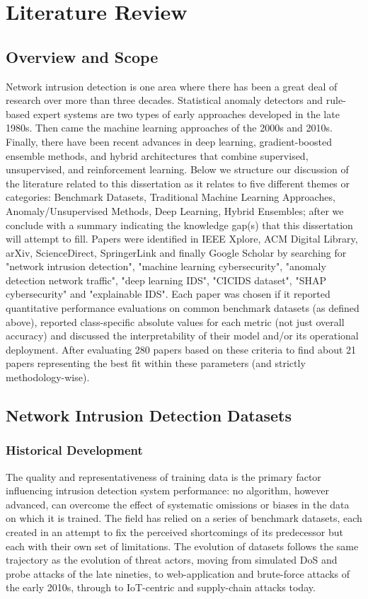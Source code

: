 \chapter{Literature Review}
\label{chap:literature}
\setlength{\parskip}{0.8em}

\section{Overview and Scope}

Network intrusion detection is one area where there has been a great deal of research over more than three decades. Statistical anomaly detectors and rule-based expert systems are two types of early approaches developed in the late 1980s. Then came the machine learning approaches of the 2000s and 2010s. Finally, there have been recent advances in deep learning, gradient-boosted ensemble methods, and hybrid architectures that combine supervised, unsupervised, and reinforcement learning. Below we structure our discussion of the literature related to this dissertation as it relates to five different themes or categories: Benchmark Datasets, Traditional Machine Learning Approaches, Anomaly/Unsupervised Methods, Deep Learning, Hybrid Ensembles; after we conclude with a summary indicating the knowledge gap(s) that this dissertation will attempt to fill.
Papers were identified in IEEE Xplore, ACM Digital Library, arXiv, ScienceDirect, SpringerLink and finally Google Scholar by searching for "network intrusion detection", "machine learning cybersecurity", "anomaly detection network traffic", "deep learning IDS", "CICIDS dataset", "SHAP cybersecurity" and "explainable IDS". Each paper was chosen if it reported quantitative performance evaluations on common benchmark datasets (as defined above), reported class-specific absolute values for each metric (not just overall accuracy) and discussed the interpretability of their model and/or its operational deployment. After evaluating 280 papers based on these criteria to find about 21 papers representing the best fit within these parameters (and strictly methodology-wise).

\section{Network Intrusion Detection Datasets}
\subsection{Historical Development}
The quality and representativeness of training data is the primary factor influencing intrusion detection system performance: no algorithm, however advanced, can overcome the effect of systematic omissions or biases in the data on which it is trained. The field has relied on a series of benchmark datasets, each created in an attempt to fix the perceived shortcomings of its predecessor but each with their own set of limitations. The evolution of datasets follows the same trajectory as the evolution of threat actors, moving from simulated DoS and probe attacks of the late nineties, to web-application and brute-force attacks of the early 2010s, through to IoT-centric and supply-chain attacks today.
